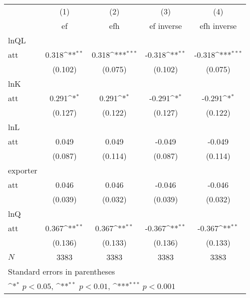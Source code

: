 {
\def\sym#1{\ifmmode^{#1}\else\(^{#1}\)\fi}
\begin{tabular}{l*{4}{c}}
\hline\hline
            &\multicolumn{1}{c}{(1)}&\multicolumn{1}{c}{(2)}&\multicolumn{1}{c}{(3)}&\multicolumn{1}{c}{(4)}\\
            &\multicolumn{1}{c}{ef}&\multicolumn{1}{c}{efh}&\multicolumn{1}{c}{ef inverse}&\multicolumn{1}{c}{efh inverse}\\
\hline
lnQL        &                     &                     &                     &                     \\
att         &       0.318\sym{**} &       0.318\sym{***}&      -0.318\sym{**} &      -0.318\sym{***}\\
            &     (0.102)         &     (0.075)         &     (0.102)         &     (0.075)         \\
\hline
lnK         &                     &                     &                     &                     \\
att         &       0.291\sym{*}  &       0.291\sym{*}  &      -0.291\sym{*}  &      -0.291\sym{*}  \\
            &     (0.127)         &     (0.122)         &     (0.127)         &     (0.122)         \\
\hline
lnL         &                     &                     &                     &                     \\
att         &       0.049         &       0.049         &      -0.049         &      -0.049         \\
            &     (0.087)         &     (0.114)         &     (0.087)         &     (0.114)         \\
\hline
exporter    &                     &                     &                     &                     \\
att         &       0.046         &       0.046         &      -0.046         &      -0.046         \\
            &     (0.039)         &     (0.032)         &     (0.039)         &     (0.032)         \\
\hline
lnQ         &                     &                     &                     &                     \\
att         &       0.367\sym{**} &       0.367\sym{**} &      -0.367\sym{**} &      -0.367\sym{**} \\
            &     (0.136)         &     (0.133)         &     (0.136)         &     (0.133)         \\
\hline
\(N\)       &        3383         &        3383         &        3383         &        3383         \\
\hline\hline
\multicolumn{5}{l}{\footnotesize Standard errors in parentheses}\\
\multicolumn{5}{l}{\footnotesize \sym{*} \(p<0.05\), \sym{**} \(p<0.01\), \sym{***} \(p<0.001\)}\\
\end{tabular}
}
